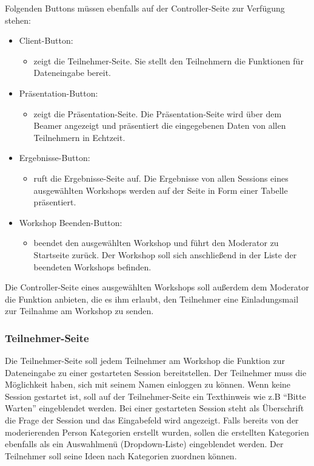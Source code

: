 Folgenden Buttons müssen ebenfalls auf der Controller-Seite zur Verfügung stehen:
\begin{itemize}
\item Client-Button:
\begin{itemize}
\item zeigt die Teilnehmer-Seite. Sie stellt den Teilnehmern die Funktionen für Dateneingabe bereit.
\end{itemize}
\item Präsentation-Button:
\begin{itemize}
\item zeigt die Präsentation-Seite. Die Präsentation-Seite wird über dem Beamer angezeigt und präsentiert die eingegebenen Daten von allen Teilnehmern in Echtzeit.
\end{itemize}
\item Ergebnisse-Button:
\begin{itemize}
\item ruft die Ergebnisse-Seite auf. Die Ergebnisse von allen Sessions eines ausgewählten Workshops werden auf der Seite in Form einer Tabelle präsentiert.
\end{itemize}
\item Workshop Beenden-Button:
\begin{itemize}
\item beendet den ausgewählten Workshop und führt den Moderator zu Startseite zurück. Der Workshop soll sich anschließend in der Liste der beendeten Workshops befinden.
\end{itemize}
\end{itemize}

Die Controller-Seite eines ausgewählten Workshops soll außerdem dem Moderator die Funktion anbieten, die es ihm erlaubt, den Teilnehmer eine Einladungsmail zur Teilnahme am Workshop zu senden.

\subsubsection*{Teilnehmer-Seite}
Die Teilnehmer-Seite soll jedem Teilnehmer am Workshop die Funktion zur Dateneingabe zu einer gestarteten Session bereitstellen. Der Teilnehmer muss die Möglichkeit haben, sich mit seinem Namen einloggen zu können. Wenn keine Session gestartet ist, soll auf der Teilnehmer-Seite ein Texthinweis wie z.B “Bitte Warten” eingeblendet werden. Bei einer gestarteten Session steht als Überschrift die Frage der Session und das Eingabefeld wird angezeigt. Falls bereits von der moderierenden Person Kategorien erstellt wurden, sollen die erstellten Kategorien ebenfalls als ein Auswahlmenü (Dropdown-Liste) eingeblendet werden. Der Teilnehmer soll seine Ideen nach Kategorien zuordnen können. 
\\

